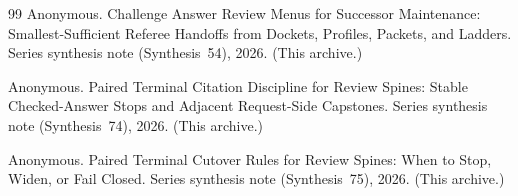 \documentclass[11pt]{article}
\begin{document}
\begin{thebibliography}{99}
Anonymous.
\newblock Challenge Answer Review Menus for Successor Maintenance: Smallest-Sufficient Referee Handoffs from Dockets, Profiles, Packets, and Ladders.
\newblock Series synthesis note (Synthesis~54), 2026. (This archive.)

Anonymous.
\newblock Paired Terminal Citation Discipline for Review Spines: Stable Checked-Answer Stops and Adjacent Request-Side Capstones.
\newblock Series synthesis note (Synthesis~74), 2026. (This archive.)

Anonymous.
\newblock Paired Terminal Cutover Rules for Review Spines: When to Stop, Widen, or Fail Closed.
\newblock Series synthesis note (Synthesis~75), 2026. (This archive.)

\end{thebibliography}
\end{document}
